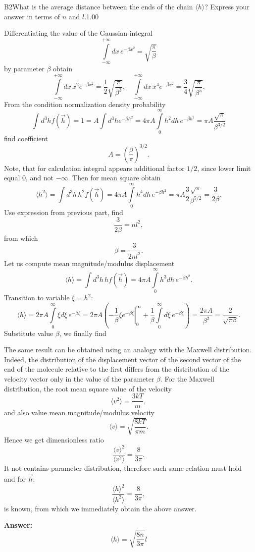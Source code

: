 \documentclass[11pt,a4paper]{article}
\begin{document}
\begin{solcard}{B2}{What is the average distance between the ends of the chain $\langle h \rangle$? Express your answer in terms of $n$ and $l$.}{1.00}

Differentiating the value of the Gaussian integral $$ \int\limits_{-\infty}^{+\infty}dx\, e^{-\beta x^2} = \sqrt{\frac{\pi}{\beta}} $$by parameter $\beta$ obtain $$ \int\limits_{-\infty}^{+\infty}dx\, x^2 e^{-\beta x^2} = \frac{1}{2}\sqrt{\frac{\pi}{\beta^3}}, \quad \int\limits_{-\infty}^{+\infty}dx\, x^4 e^{-\beta x^2} =\frac{3}{4} \sqrt{\frac{\pi}{\beta^5}}. $$From the condition normalization density probability $$ \int d^3 h f(\vec{h}) = 1 = A \int d^3 h e^{- \beta h^2} = 4 \pi A \int\limits_0^{\infty}h^2 dh\, e^{- \beta h^2} =  \pi A \frac{\sqrt{\pi}}{\beta^{3/2}} $$find coefficient $$ A = \left(\frac{\beta}{\pi}\right)^{3/2}. $$Note, that for calculation integral appears additional factor $1/2$, since lower limit equal $0$, and not $- \infty$. Then for mean square obtain $$ \langle h^2 \rangle = \int d^3 h \, h^2 f(\vec{h}) = 4\pi A \int\limits_0^{\infty}h^4 dh\, e^{-\beta h^2} = \pi A \frac{3}{2} \frac{\sqrt{\pi}}{\beta^{5/2}} = \frac{3}{2 \beta}. $$Use expression from previous part, find $$ \frac{3}{2 \beta} = nl^2, $$from which $$ \beta = \frac{3}{2 n l^2}. $$ Let us compute mean magnitude/modulus displacement $$ \langle h \rangle = \int d^3 h\, h f(\vec{h}) = 4\pi A \int\limits_0^{\infty} h^3 dh\, e^{-\beta h^2}. $$Transition to variable $\xi = h^2$: $$ \langle h \rangle = 2\pi A \int\limits_0^{\infty}\xi d \xi\, e^{- \beta \xi} = 2 \pi A\left(\left. - \frac{1}{\beta} \xi e^{-\beta \xi}\right|_0^{\infty} + \frac{1}{\beta}\int\limits_0^{\infty} d \xi\, e^{- \beta \xi}\right) = \frac{2\pi A}{\beta^2} = \frac{2}{\sqrt{\pi \beta}}. $$Substitute value $\beta$, we finally find


The same result can be obtained using an analogy with the Maxwell distribution. Indeed, the distribution of the displacement vector of the second vector of the end of the molecule relative to the first differs from the distribution of the velocity vector only in the value of the parameter $\beta$. For the Maxwell distribution, the root mean square value of the velocity $$ \langle v^2 \rangle  = \frac{3 k T}{m}, $$and also value mean magnitude/modulus velocity $$ \langle v \rangle = \sqrt{\frac{8 k T}{\pi m}}. $$Hence we get dimensionless ratio $$ \frac{\langle v \rangle ^2}{\langle v^2 \rangle} = \frac{8}{3\pi}. $$It not contains parameter distribution, therefore such same relation must hold and for  $\vec{h}$: $$ \frac{\langle h \rangle ^2}{\langle h^2 \rangle} = \frac{8}{3\pi}, $$ is known, from which we immediately obtain the above answer.

\par\smallskip\noindent\textbf{Answer:} $$ \langle h \rangle = \sqrt{\frac{8 n}{3\pi}} l $$
\end{solcard}
\end{document}
